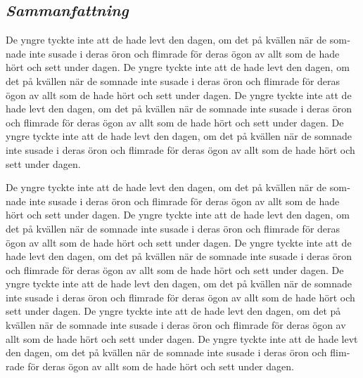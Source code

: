 \documentclass{UUThesisTemplate}
\begin{document}
\begin{swedish}
\chapter*{\emph{Sammanfattning}}
{\noteunic
\par De yngre tyckte inte att de hade levt den dagen, om det på kvällen när de somnade inte susade i deras öron och flimrade för deras ögon av allt som de hade hört och sett under dagen. De yngre tyckte inte att de hade levt den dagen, om det på kvällen när de somnade inte susade i deras öron och flimrade för deras ögon av allt som de hade hört och sett under dagen. De yngre tyckte inte att de hade levt den dagen, om det på kvällen när de somnade inte susade i deras öron och flimrade för deras ögon av allt som de hade hört och sett under dagen. De yngre tyckte inte att de hade levt den dagen, om det på kvällen när de somnade inte susade i deras öron och flimrade för deras ögon av allt som de hade hört och sett under dagen.
\par De yngre tyckte inte att de hade levt den dagen, om det på kvällen när de somnade inte susade i deras öron och flimrade för deras ögon av allt som de hade hört och sett under dagen. De yngre tyckte inte att de hade levt den dagen, om det på kvällen när de somnade inte susade i deras öron och flimrade för deras ögon av allt som de hade hört och sett under dagen. De yngre tyckte inte att de hade levt den dagen, om det på kvällen när de somnade inte susade i deras öron och flimrade för deras ögon av allt som de hade hört och sett under dagen. De yngre tyckte inte att de hade levt den dagen, om det på kvällen när de somnade inte susade i deras öron och flimrade för deras ögon av allt som de hade hört och sett under dagen. De yngre tyckte inte att de hade levt den dagen, om det på kvällen när de somnade inte susade i deras öron och flimrade för deras ögon av allt som de hade hört och sett under dagen. De yngre tyckte inte att de hade levt den dagen, om det på kvällen när de somnade inte susade i deras öron och flimrade för deras ögon av allt som de hade hört och sett under dagen.
}
\end{swedish}
\end{document}
